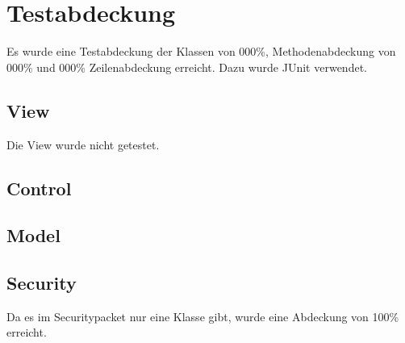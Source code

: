 \section{Testabdeckung}
Es wurde eine Testabdeckung der Klassen von 000\%, Methodenabdeckung von 000\% und 000\% Zeilenabdeckung erreicht. Dazu wurde JUnit verwendet.

\subsection{View}
Die View wurde nicht getestet.

\subsection{Control}

\subsection{Model}

\subsection{Security}
Da es im Securitypacket nur eine Klasse gibt, wurde eine Abdeckung von 100\% erreicht.
